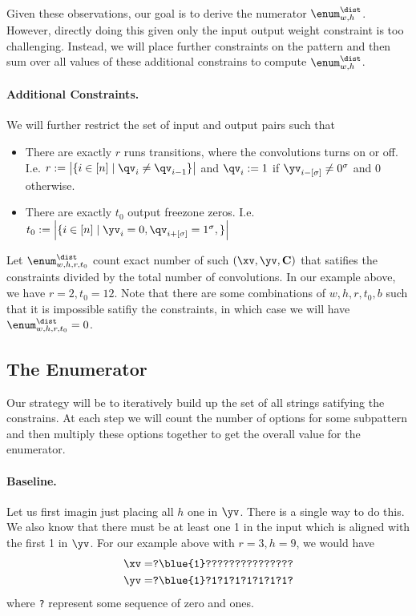 Given these observations, our goal is to derive the numerator $\enum^\dist_{w,h}$. However, directly doing this given only the input output weight constraint is too challenging. Instead, we will place further constraints on the pattern and then sum over all values of these additional constrains to compute $\enum^\dist_{w,h}$. 

\paragraph{Additional Constraints.} We will further restrict the set of input and output pairs such that 
\begin{itemize}
    \item There are exactly $r$ runs transitions, where the convolutions turns on or off. I.e. $r:=\left|\{i\in [n] \mid \qv_{i}\neq \qv_{i-1} \}\right|$ and $\qv_i:=1$ if $\yv_{i-[\sigma]}\neq0^\sigma$ and 0 otherwise.
    \item There are exactly $t_0$ output freezone zeros. I.e. $t_0:=\left|\{i \in [n] \mid \yv_i=0,\qv_{i+[\sigma]}=1^\sigma,\}\right|$
\end{itemize}
Let $\enum^\dist_{w,h,r,t_0}$ count exact number of such $(\xv,\yv,\C)$ that satifies the constraints divided by the total number of convolutions.
In our example above, we have $r=2,t_0=12$. Note that there are some combinations of $w,h,r,t_0,b$ such that it is impossible satifiy the constraints, in which case we will have $\enum^\dist_{w,h,r,t_0}=0$. 



\subsection{The Enumerator}

Our strategy will be to iteratively build up the set of all strings satifying the constrains. At each step we will count the number of options for some subpattern and then multiply these options together to get the overall value for the enumerator.

\paragraph{Baseline.} Let us first imagin just placing all $h$ one in $\yv$. There is a single way to do this. We also know that there must be at least one 1 in the input which is aligned with the first 1 in $\yv$.  For our example above with $r=3,h=9$, we would have
\begin{align*}
    \xv=&\texttt{?\blue{1}???????????????}\\
    \yv=&\texttt{?\blue{1}?1?1?1?1?1?1?1?}
\end{align*}
where \texttt{?} represent some sequence of zero and ones. 


